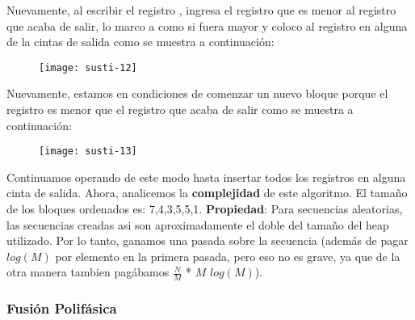 \documentclass[10pt,a4paper]{article}
\begin{document}
Nuevamente, al escribir el registro , ingresa el registro  que es menor al registro  que acaba de salir, lo marco a  como si fuera mayor y coloco al registro  en alguna de la cintas de salida como se muestra a continuación:
\newline
\newline
\begin{figure}[h]
	\centering
\texttt{[image: susti-12]}
	\label{drivers1}
\end{figure}      
\newline
\newline
Nuevamente, estamos en condiciones de comenzar un nuevo bloque porque el registro  es menor que el registro  que acaba de salir como se muestra a continuación:
\newline
\newline
\begin{figure}[h]
	\centering
\texttt{[image: susti-13]}
	\label{drivers1}
\end{figure}      
\newline
\newline
Continuamos operando de este modo hasta insertar todos los registros en alguna cinta de salida.
\newline
\newline
Ahora, analicemos la \textbf{complejidad} de este algoritmo.
\newline
\newline
El tamaño de los bloques ordenados es: 7,4,3,5,5,1.
\newline
\newline
\textbf{Propiedad}: Para secuencias aleatorias, las secuencias creadas asi son aproximadamente el doble del tamaño del heap utilizado.
\newline
\newline
Por lo tanto, ganamos una pasada sobre la secuencia (además de pagar $log(M)$ por elemento en la primera pasada, pero eso no es grave, ya que de la otra manera tambien pagábamos $\displaystyle \frac{N}{M}$ * $M$ $log(M)$). 
\newpage

\subsubsection{Fusión Polifásica}
\end{document}
